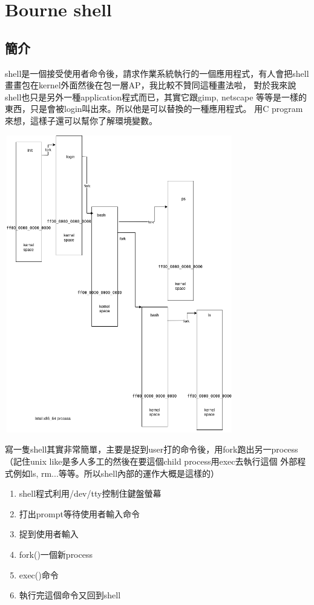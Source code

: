     \chapter{Bourne shell}
    \section{簡介}
    shell是一個接受使用者命令後，請求作業系統執行的一個應用程式，有人會把shell
    畫畫包在kernel外面然後在包一層AP，我比較不贊同這種畫法啦，
    對於我來說shell也只是另外一種application程式而已，其實它跟gimp, netscape
    等等是一樣的東西，只是會被login叫出來。所以他是可以替換的一種應用程式。
    用C program來想，這樣子還可以幫你了解環境變數。
    \begin{center}
    \includegraphics[width=10cm,height=13cm]{images/shell.png}
    \end{center}
    寫一隻shell其實非常簡單，主要是捉到user打的命令後，用fork跑出另一process
    （記住unix like是多人多工的然後在要這個child process用exec去執行這個
    外部程式例如ls, rm...等等。所以shell內部的運作大概是這樣的）
    \begin{enumerate}
    \item shell程式利用/dev/tty控制住鍵盤螢幕
    \item 打出prompt等待使用者輸入命令
    \item 捉到使用者輸入
    \item fork()一個新process
    \item exec()命令
    \item 執行完這個命令又回到shell
    \end{enumerate}
